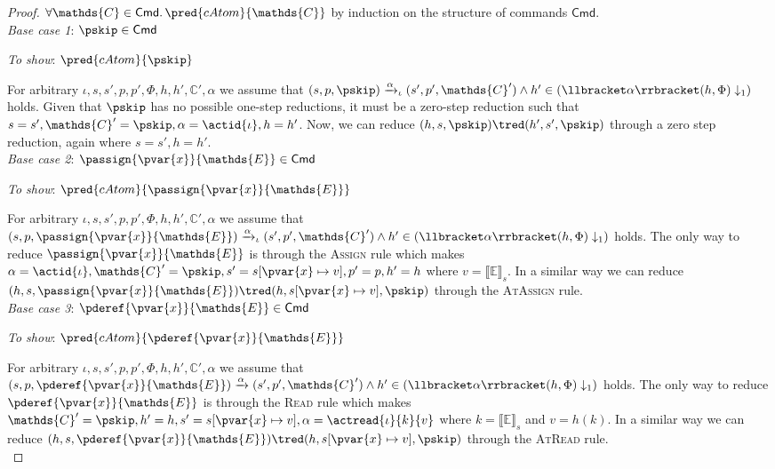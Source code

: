{\parindent0pt
\begin{proof}
$\forall \mathds{C} \in \mathsf{Cmd} \ldotp \pred{cAtom}{\mathds{C}}$ by induction on the structure of commands $\mathsf{Cmd}$. \\

\textit{Base case 1}: $\pskip \in \mathsf{Cmd}$

\textit{To show}: $\pred{cAtom}{\pskip}$

For arbitrary $\iota, s, s', p, p', \Phi, h, h', \mathds{C}', \alpha$ we assume that $(s, p, \pskip) \xrightarrow{\alpha}_\iota (s', p', \mathds{C}') \land h' \in \left( \llbracket \alpha \rrbracket(h, \Phi) \downarrow_1 \right)$ holds. Given that $\pskip$ has no possible one-step reductions, it must be a zero-step reduction such that $s = s', \mathds{C}' = \pskip, \alpha = \actid{\iota}, h = h'$. Now, we can reduce $(h, s, \pskip) \tred (h', s', \pskip)$ through a zero step reduction, again where $s = s', h = h'$. \\

\textit{Base case 2}: $\passign{\pvar{x}}{\mathds{E}} \in \mathsf{Cmd}$

\textit{To show}: $\pred{cAtom}{\passign{\pvar{x}}{\mathds{E}}}$

For arbitrary $\iota, s, s', p, p', \Phi, h, h', \mathds{C}', \alpha$ we assume that $(s, p, \passign{\pvar{x}}{\mathds{E}}) \xrightarrow{\alpha}_\iota (s', p', \mathds{C}') \land h' \in \left( \llbracket \alpha \rrbracket(h, \Phi) \downarrow_1 \right)$ holds. The only way to reduce $\passign{\pvar{x}}{\mathds{E}}$ is through the \textsc{Assign} rule which makes $\alpha = \actid{\iota}, \mathds{C}' = \pskip, s' = s[\pvar{x} \mapsto v], p' = p, h' = h$ where $v = \llbracket \mathds{E} \rrbracket_s$. In a similar way we can reduce $(h, s, \passign{\pvar{x}}{\mathds{E}}) \tred (h, s[\pvar{x} \mapsto v], \pskip)$ through the \textsc{AtAssign} rule. \\

\textit{Base case 3}: $\pderef{\pvar{x}}{\mathds{E}} \in \mathsf{Cmd}$

\textit{To show}: $\pred{cAtom}{\pderef{\pvar{x}}{\mathds{E}}}$

For arbitrary $\iota, s, s', p, p', \Phi, h, h', \mathds{C}', \alpha$ we assume that $(s, p, \pderef{\pvar{x}}{\mathds{E}}) \xrightarrow{\alpha} (s', p', \mathds{C}') \land h' \in \left( \llbracket \alpha \rrbracket(h, \Phi) \downarrow_1 \right)$ holds. The only way to reduce $\pderef{\pvar{x}}{\mathds{E}}$ is through the \textsc{Read} rule which makes $\mathds{C}' = \pskip, h' = h, s' = s[\pvar{x} \mapsto v], \alpha = \actread{\iota}{k}{v}$ where $k = \llbracket \mathds{E} \rrbracket_s$ and $v = h(k)$. In a similar way we can reduce $(h, s, \pderef{\pvar{x}}{\mathds{E}}) \tred (h, s[\pvar{x} \mapsto v], \pskip)$ through the \textsc{AtRead} rule. \\


\end{proof}}
